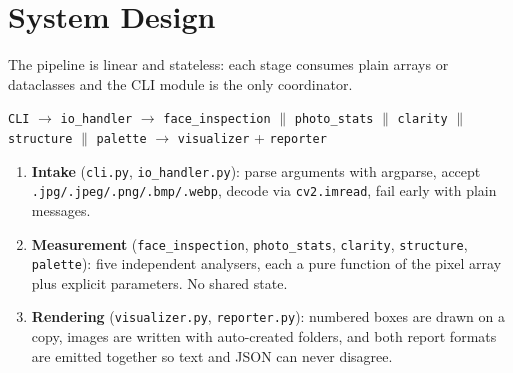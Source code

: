 \documentclass[11pt,a4paper]{article}
\begin{document}
\section{System Design}
The pipeline is linear and stateless: each stage consumes plain arrays or
dataclasses and the CLI module is the only coordinator.

\begin{center}
\small
\texttt{CLI} $\rightarrow$ \texttt{io\_handler} $\rightarrow$
\texttt{face\_inspection} $\parallel$ \texttt{photo\_stats} $\parallel$
\texttt{clarity} $\parallel$ \texttt{structure} $\parallel$ \texttt{palette}
$\rightarrow$ \texttt{visualizer} + \texttt{reporter}
\end{center}

\begin{enumerate}[leftmargin=1.5em]
  \item \textbf{Intake} (\texttt{cli.py}, \texttt{io\_handler.py}): parse
    arguments with argparse, accept \texttt{.jpg/.jpeg/.png/.bmp/.webp},
    decode via \texttt{cv2.imread}, fail early with plain messages.
  \item \textbf{Measurement} (\texttt{face\_inspection}, \texttt{photo\_stats},
    \texttt{clarity}, \texttt{structure}, \texttt{palette}): five independent
    analysers, each a pure function of the pixel array plus explicit
    parameters. No shared state.
  \item \textbf{Rendering} (\texttt{visualizer.py}, \texttt{reporter.py}):
    numbered boxes are drawn on a copy, images are written with
    auto-created folders, and both report formats are emitted together so
    text and JSON can never disagree.
\end{enumerate}

\end{document}
